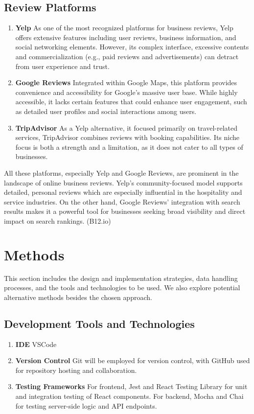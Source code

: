 \documentclass[10pt,twocolumn]{article}
\begin{document}
\subsection{Review Platforms}
\begin{enumerate}
    \item \textbf{Yelp} As one of the most recognized platforms for business reviews, Yelp offers extensive features including user reviews, business information, and social networking elements. However, its complex interface, excessive contents and commercialization (e.g., paid reviews and advertisements) can detract from user experience and trust.
    
    \item \textbf{Google Reviews} Integrated within Google Maps, this platform provides convenience and accessibility for Google’s massive user base. While highly accessible, it lacks certain features that could enhance user engagement, such as detailed user profiles and social interactions among users.
    
    \item \textbf{TripAdvisor} As a Yelp alternative, it focused primarily on travel-related services, TripAdvisor combines reviews with booking capabilities. Its niche focus is both a strength and a limitation, as it does not cater to all types of businesses.
    \end{enumerate}
    All these platforms, especially Yelp and Google Reviews, are prominent in the landscape of online business reviews. Yelp's community-focused model supports detailed, personal reviews which are especially influential in the hospitality and service industries. On the other hand, Google Reviews' integration with search results makes it a powerful tool for businesses seeking broad visibility and direct impact on search rankings. (B12.io)

    \section{Methods}
    This section includes the design and implementation strategies, data handling processes, and the tools and technologies to be used. We also explore potential alternative methods besides the chosen approach.
    
    \subsection{Development Tools and Technologies}  
\begin{enumerate}    
        \item \textbf{IDE} VSCode
        \item \textbf{Version Control} Git will be employed for version control, with GitHub used for repository hosting and collaboration.
        \item \textbf{Testing Frameworks} For frontend, Jest and React Testing Library for unit and integration testing of React components. For backend, Mocha and Chai for testing server-side logic and API endpoints.
\end{enumerate}
\end{document}
